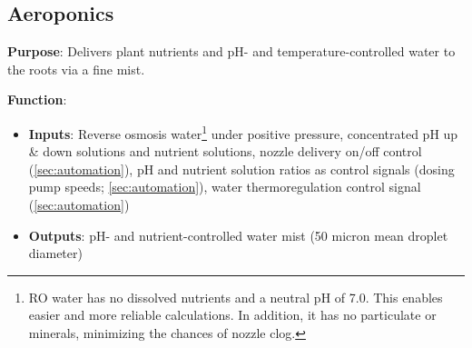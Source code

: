 \subsection{Aeroponics}
\label{sec:aeroponics}

\textbf{Purpose}: Delivers plant nutrients and pH- and temperature-controlled water to the roots via a fine mist.

\textbf{Function}:
\begin{itemize}
    \item \textbf{Inputs}: Reverse osmosis water\footnote{RO water has no dissolved nutrients and a neutral pH of 7.0. This enables easier and more reliable calculations. In addition, it has no particulate or minerals, minimizing the chances of nozzle clog.} under positive pressure, concentrated pH up \& down solutions and nutrient solutions, nozzle delivery on/off control (\ref{sec:automation}), pH and nutrient solution ratios as control signals (dosing pump speeds; \ref{sec:automation}), water thermoregulation control signal (\ref{sec:automation})
    \item \textbf{Outputs}: pH- and nutrient-controlled water mist (50 micron mean droplet diameter)
\end{itemize}

